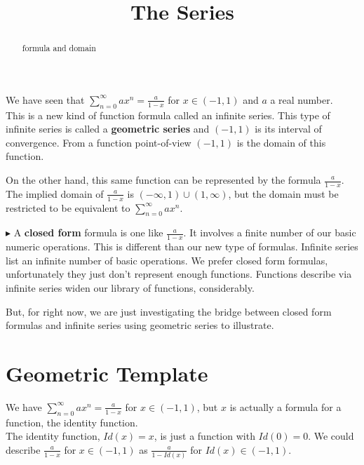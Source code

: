 \documentclass{ximera}
\title{The Series}
\begin{document}
\begin{abstract}
formula and domain
\end{abstract}
\maketitle




We have seen that $\sum\limits_{n=0}^{\infty} a x^n = \frac{a}{1-x}$ for $x \in (-1, 1)$ and $a$ a real number. \\




This is a new kind of function formula called an infinite series.  This type of infinite series is called a \textbf{geometric series} and $(-1, 1)$ is its interval of convergence.  From a function point-of-view $(-1, 1)$  is the domain of this function.


On the other hand, this same function can be represented by the formula $\frac{a}{1-x}$.  The implied domain of $\frac{a}{1-x}$ is $(-\infty, 1) \cup (1, \infty)$, but the domain must be restricted to be equivalent to $\sum\limits_{n=0}^{\infty} a x^n$.   




$\blacktriangleright$ A \textbf{closed form} formula is one like  $\frac{a}{1-x}$.  It involves a finite number of our basic numeric operations.  This is different than our new type of formulas.  Infinite series list an infinite number of basic operations.  We prefer closed form formulas, unfortunately they just don't represent enough functions. Functions describe via infinite series widen our library of functions, considerably.

But, for right now, we are just investigating the bridge between closed form formulas and infinite series using geometric series to illustrate.






\section{Geometric Template}


We have $\sum\limits_{n=0}^{\infty} a x^n = \frac{a}{1-x}$ for $x \in (-1, 1)$, but $x$ is actually a formula for a function, the identity function. \\



The identity function, $Id(x) = x$, is just a function with $Id(0) = 0$.  We could describe $\frac{a}{1-x}$ for $x \in (-1, 1)$ as $\frac{a}{1-Id(x)}$ for $Id(x) \in (-1, 1)$.
\end{document}
